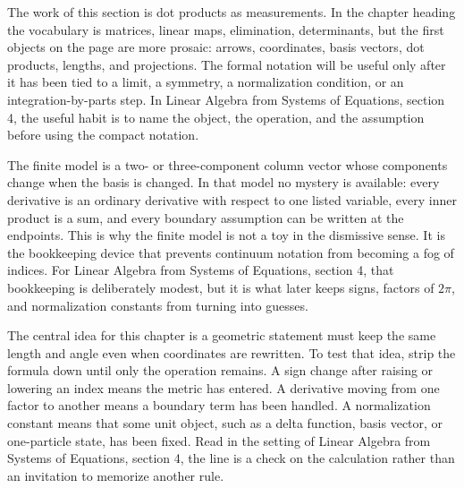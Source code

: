 











The work of this section is dot products as measurements.  In the chapter heading the vocabulary is matrices, linear maps, elimination, determinants, but the first objects on the page are more prosaic: arrows, coordinates, basis vectors, dot products, lengths, and projections.  The formal notation will be useful only after it has been tied to a limit, a symmetry, a normalization condition, or an integration-by-parts step.  In Linear Algebra from Systems of Equations, section 4, the useful habit is to name the object, the operation, and the assumption before using the compact notation.

The finite model is a two- or three-component column vector whose components change when the basis is changed.  In that model no mystery is available: every derivative is an ordinary derivative with respect to one listed variable, every inner product is a sum, and every boundary assumption can be written at the endpoints.  This is why the finite model is not a toy in the dismissive sense.  It is the bookkeeping device that prevents continuum notation from becoming a fog of indices.  For Linear Algebra from Systems of Equations, section 4, that bookkeeping is deliberately modest, but it is what later keeps signs, factors of \(2\pi\), and normalization constants from turning into guesses.

The central idea for this chapter is a geometric statement must keep the same length and angle even when coordinates are rewritten.  To test that idea, strip the formula down until only the operation remains.  A sign change after raising or lowering an index means the metric has entered.  A derivative moving from one factor to another means a boundary term has been handled.  A normalization constant means that some unit object, such as a delta function, basis vector, or one-particle state, has been fixed.  Read in the setting of Linear Algebra from Systems of Equations, section 4, the line is a check on the calculation rather than an invitation to memorize another rule.

